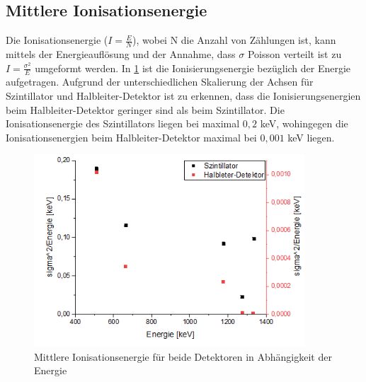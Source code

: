 \subsection{Mittlere Ionisationsenergie}
Die Ionisationsenergie ($I = \frac{E}{N}$), wobei N die Anzahl von Zählungen ist, kann mittels der Energieauflösung und der Annahme, dass $\sigma$ Poisson verteilt ist zu $I = \frac{\sigma^2}{E}$ umgeformt werden.
In \cref{sig2} ist die Ionisierungsenergie bezüglich der Energie aufgetragen. Aufgrund der unterschiedlichen Skalierung der Achsen für Szintillator und Halbleiter-Detektor ist zu erkennen, dass die Ionisierungsenergien beim Halbleiter-Detektor geringer sind als beim Szintillator. Die Ionisationsenergie des Szintillators liegen bei maximal $0,2$ keV, wohingegen die Ionisationsenergien beim Halbleiter-Detektor maximal bei $0,001$ keV liegen.
\begin{figure}[h!]
	\centering
	\includegraphics[width=0.9\textwidth]{sigma2.png}
	\caption{Mittlere Ionisationsenergie für beide Detektoren in Abhängigkeit der Energie}
	\label{sig2}
\end{figure}

